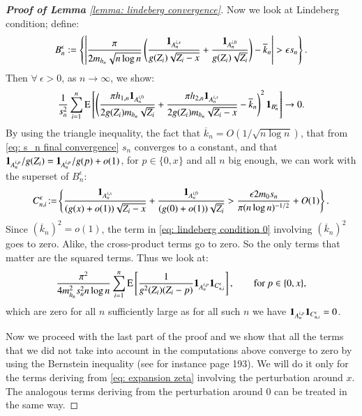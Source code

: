 \begin{proof}[\hypertarget{proof of lemma 7}{\textbf{Proof of Lemma}} \ref{lemma: lindeberg convergence}]
Now we look at Lindeberg condition; define: 
\begin{align*}
    B^{\epsilon}_n := \left\{\left| \frac{\pi}{2 m_{h_n}\sqrt{n \log{n}}} \left( \frac{\mathbf{1}_{A^{i,x}_n}}{ g(Z_i)  \sqrt{Z_i - x}}  + \frac{\mathbf{1}_{A^{i,0}_n}}{ g(Z_i)  \sqrt{Z_i}}  \right) - \overline{k}_n \right| > \epsilon s_n  \right\}.
\end{align*}
Then $\forall \: \epsilon > 0$, as $n \rightarrow \infty$, we show:
\begin{align}\label{eq: lindeberg condition 0}
    \frac{1}{ s^2_n}\sum_{i=1}^n \mathrm{E}  \left[ \left( \frac{\pi h_{1,n} \mathbf{1}_{A^{i,0}_n}}{ 2 g(Z_i) m_{h_n} \sqrt{Z_i}} + \frac{\pi h_{2,n} \mathbf{1}_{A^{i,x}_n}}{ 2 g(Z_i) m_{h_n}   \sqrt{Z_i - x}}  - \overline{k}_n \right)^2 \mathbf{1}_{B^{\epsilon}_n} \right] \rightarrow 0.
\end{align}
By using the triangle inequality, the fact that $\overline{k}_n = O(1/\sqrt{n \log{n}})$, that from \eqref{eq: s_n final convergence} $s_n$ converges to a constant, and that $\mathbf{1}_{A^{i,p}_n} / g(Z_i) = \mathbf{1}_{A^{i,p}_n}/g(p) +o(1)$, for $p \in \{0,x \}$ and all $n$ big enough, we can work with the superset of $B^{\epsilon}_n$:
\begin{align*}
     C^{\epsilon}_{n,i} \hspace{-0.05cm} := \hspace{-0.05cm} \left\{ \frac{\ind_{A^{i,x}_n}}{ (g(x) + o(1))  \sqrt{Z_i - x}}  + \frac{\ind_{A^{i,0}_n}}{ (g(0) + o(1))  \sqrt{Z_i}} > \frac{\epsilon 2 m_0  s_n }{\pi (n \log{n})^{-1/2} } +O(1) \right\}.  
\end{align*}
Since $(\overline{k}_n)^2 = o(1)$, the term in \eqref{eq: lindeberg condition 0} involving $(\overline{k}_n)^2$ goes to zero. Alike, the cross-product terms go to zero. So the only terms that matter are the squared terms. Thus we look at:  
\begin{align*}
     \frac{\pi^2}{4 m^2_{h_n} s^2_n n \log{n} } \sum_{i=1}^n \mathrm{E}  \left[ \frac{1}{g^2(Z_i)  (Z_i - p)} \mathbf{1}_{A^{i,p}_n} \mathbf{1}_{C^{\epsilon}_{n,i}} \right], \quad \quad \text{for} \: p \in \{0,x\},
\end{align*}
which are zero for all $n$ sufficiently large as for all such $n$ we have $\mathbf{1}_{A^{i,p}_n} \mathbf{1}_{C^{\epsilon}_{n,i}} = 0$.

Now we proceed with the last part of the proof and we show that all the terms that we did not take into account in the computations above converge to zero by using the Bernstein inequality (see for instance \cite{11} page 193). We will do it only for the terms deriving from \eqref{eq: expansion zeta} involving the perturbation around $x$. The analogous terms deriving from the perturbation around $0$ can be treated in the same way.


\end{proof}
